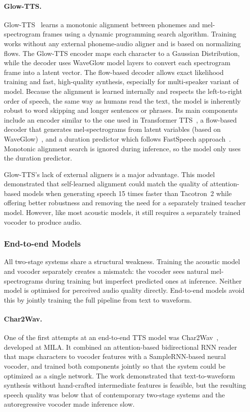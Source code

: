 \documentclass[
         english, %
    monochrome, %
]{VUMIFSEMasterThesis}
\begin{document}
\paragraph{Glow-TTS.}
Glow-TTS~\cite{kim2020glow} learns a monotonic alignment between phonemes and mel-spectrogram frames using a dynamic programming search algorithm.
Training works without any external phoneme-audio aligner and is based on normalizing flows.
The Glow-TTS encoder maps each character to a Gaussian Distribution, while the decoder uses WaveGlow model layers to convert each spectrogram frame into a latent vector.
The flow-based decoder allows exact likelihood training and fast, high-quality synthesis, especially for multi-speaker variant of model.
Because the alignment is learned internally and respects the left-to-right order of speech, the same way as humans read the text, the model is inherently robust to word skipping and longer sentences or phrases.
Its main components include an encoder similar to the one used in Transformer TTS~\cite{li2019neural}, a flow-based decoder that generates mel-spectrograms from latent variables (based on WaveGlow)~\cite{prenger2019waveglow}, and a duration predictor which follows FastSpeech approach~\cite{ren2019fastspeech}.
Monotonic alignment search is ignored during inference, so the model only uses the duration predictor.

Glow-TTS's lack of external aligners is a major advantage.
This model demonstrated that self-learned alignment could match the quality of attention-based models when generating speech 15 times faster than Tacotron~2 while offering better robustness and removing the need for a separately trained teacher model.
However, like most acoustic models, it still requires a separately trained vocoder to produce audio.

\subsubsection{End-to-end Models}

All two-stage systems share a structural weakness.
Training the acoustic model and vocoder separately creates a mismatch: the vocoder sees natural mel-spectrograms during training but imperfect predicted ones at inference.
Neither model is optimised for perceived audio quality directly.
End-to-end models avoid this by jointly training the full pipeline from text to waveform.

\paragraph{Char2Wav.}
One of the first attempts at an end-to-end TTS model was Char2Wav~\cite{sotelo2017char2wav}, developed at MILA.
It combined an attention-based bidirectional RNN reader that maps characters to vocoder features with a SampleRNN-based neural vocoder, and trained both components jointly so that the system could be optimized as a single network.
The work demonstrated that text-to-waveform synthesis without hand-crafted intermediate features is feasible, but the resulting speech quality was below that of contemporary two-stage systems and the autoregressive vocoder made inference slow.
\end{document}
